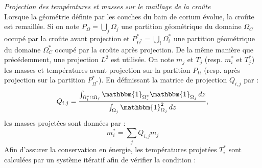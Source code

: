{\it Projection des températures et masses sur le maillage de la croûte}\\
Lorsque la géométrie définie par les couches du bain de corium évolue, la croûte est remaillée. Si on note $P_{\Omega}=\displaystyle{\bigcup_j} \Omega_j$ une partition géométrique du domaine $\Omega_C$ occupé par la croûte avant projection et $P_{\Omega^*}^*=\displaystyle{\bigcup_i} \Omega_i^*$ une partition géométrique du domaine $\Omega_C^*$ occupé par la croûte après projection. De la même manière que précédemment, une projection $L^2$ est utilisée.
On note $m_j$ et $T_j$ (resp. $m_i^*$ et $T_j^*$) les masses et températures avant projection sur la partition $P_{\Omega}$ (resp. après projection sur la partition $P_{\Omega^*}^*$). En définissant la matrice de projection $Q_{i,j}$ par :
$$Q_{i,j}=\frac{\int_{\Omega_i^*\cap\Omega_j}{\mathbbm{1}}_{\Omega_i^*}{\mathbbm{1}}_{\Omega_j}\, dz}{ \int_{\Omega_j}{\mathbbm{1}}_{\Omega_j}^2\, dz},$$ les masses projetées sont données par :
$$m_i^*=\sum_j Q_{i,j} m_j$$
Afin d'assurer la conservation en énergie, les températures projetées $T_i^*$ sont calculées par un système itératif afin de vérifier la condition :
